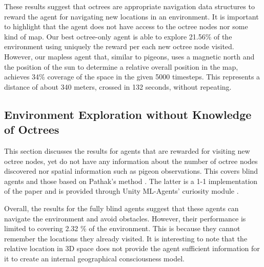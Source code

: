         

        These results suggest that octrees are appropriate navigation data structures to reward the agent for navigating new locations in an environment. It is important to highlight that the agent does not have access to the octree nodes nor some kind of map. Our best octree-only agent is able to explore 21.56\% of the environment using uniquely the reward per each new octree node visited. However, our mapless agent that, similar to pigeons, uses a magnetic north and the position of the sun to determine a relative overall position in the map, achieves 34\% coverage of the space in the given 5000 timesteps. This represents a distance of about 340 meters, crossed in 132 seconds, without repeating.
    
    \subsection{Environment Exploration without Knowledge of Octrees}
        This section discusses the results for agents that are rewarded for visiting new octree nodes, yet do not have any information about the number of octree nodes discovered nor spatial information such as pigeon observations. This covers blind agents and those based on Pathak's method \cite{pathak2017curiosity}. The latter is a 1-1 implementation of the paper and is provided through Unity ML-Agents' curiosity module \cite{github-unity-mlagents-toolkit}.
        
        Overall, the results for the fully blind agents suggest that these agents can navigate the environment and avoid obstacles. However, their performance is limited to covering 2.32 \% of the environment. This is because they cannot remember the locations they already visited. 
        It is interesting to note that the relative location in 3D space does not provide the agent sufficient information for it to create an internal geographical consciousness model.
        
